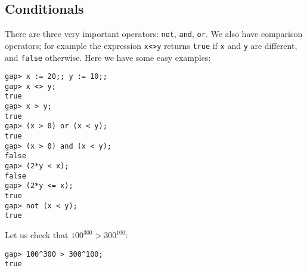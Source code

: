 \subsection*{Conditionals}

There are three very important operators: \lstinline{not}, \lstinline{and},
\lstinline{or}.  We also have comparison operators; for example the expression
\lstinline{x<>y} returns \lstinline{true} if \lstinline{x} and \lstinline{y}
are different, and \lstinline{false} otherwise.  Here we have
some easy examples: 
\begin{lstlisting}
gap> x := 20;; y := 10;;
gap> x <> y;
true
gap> x > y;
true
gap> (x > 0) or (x < y);
true
gap> (x > 0) and (x < y);
false
gap> (2*y < x);
false
gap> (2*y <= x);
true
gap> not (x < y);
true	
\end{lstlisting}

\begin{example}
	Let us check that $100^{300}>300^{100}$:
\begin{lstlisting}
gap> 100^300 > 300^100;
true
\end{lstlisting}
\end{example}


